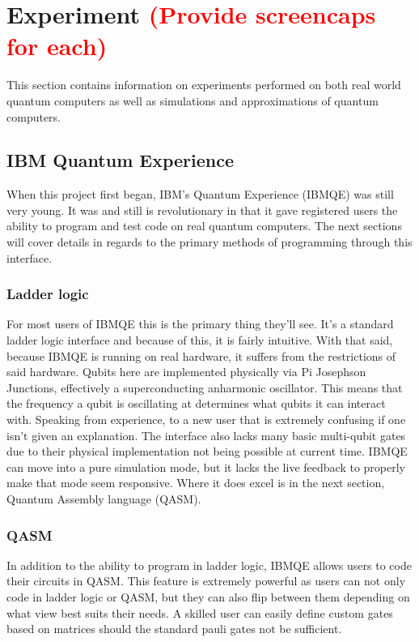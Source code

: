 \documentclass[a4paper]{article}
\begin{document}
\section{Experiment \textcolor{red}{(Provide screencaps for each)}} 
This section contains information on experiments performed on both real world quantum computers as well as simulations and approximations of quantum computers.


\subsection{IBM Quantum Experience}
When this project first began, IBM's Quantum Experience (IBMQE) was still very young.  It was and still is revolutionary in that it gave registered users the ability to program and test code on real quantum computers.  The next sections will cover details in regards to the primary methods of programming through this interface.
\subsubsection{Ladder logic} %
For most users of IBMQE this is the primary thing they'll see.  It's a standard ladder logic interface and because of this, it is fairly intuitive.  With that said, because IBMQE is running on real hardware, it suffers from the restrictions of said hardware.  Qubits here are implemented physically via Pi Josephson Junctions, effectively a superconducting anharmonic oscillator.  This means that the frequency a qubit is oscillating at determines what qubits it can interact with.  Speaking from experience, to a new user that is extremely confusing if one isn't given an explanation.  The interface also lacks many basic multi-qubit gates due to their physical implementation not being possible at current time.\newline
\newline
IBMQE can move into a pure simulation mode, but it lacks the live feedback to properly make that mode seem responsive.  Where it does excel is in the next section, Quantum Assembly language (QASM).
\subsubsection{QASM} %
In addition to the ability to program in ladder logic, IBMQE allows users to code their circuits in QASM.  This feature is extremely powerful as users can not only code in ladder logic or QASM, but they can also flip between them depending on what view best suits their needs.  A skilled user can easily define custom gates based on matrices should the standard pauli gates not be sufficient.  
\end{document}

